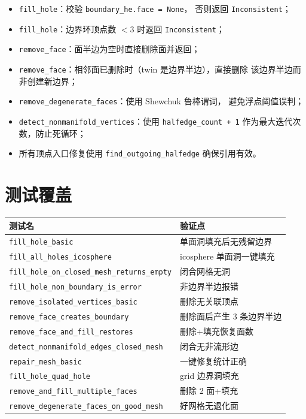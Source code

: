 \documentclass[11pt,a4paper]{article}
\begin{document}
\begin{itemize}
  \item \texttt{fill\_hole}：校验 \texttt{boundary\_he.face = None}，
        否则返回 \texttt{Inconsistent}；
  \item \texttt{fill\_hole}：边界环顶点数 $< 3$ 时返回 \texttt{Inconsistent}；
  \item \texttt{remove\_face}：面半边为空时直接删除面并返回；
  \item \texttt{remove\_face}：相邻面已删除时（twin 是边界半边），直接删除
        该边界半边而非创建新边界；
  \item \texttt{remove\_degenerate\_faces}：使用 Shewchuk 鲁棒谓词，
        避免浮点阈值误判；
  \item \texttt{detect\_nonmanifold\_vertices}：使用 \texttt{halfedge\_count + 1}
        作为最大迭代次数，防止死循环；
  \item 所有顶点入口修复使用 \texttt{find\_outgoing\_halfedge} 确保引用有效。
\end{itemize}

\section{测试覆盖}

\begin{center}
\renewcommand{\arraystretch}{1.18}
\begin{tabular}{@{}ll@{}}
  \toprule
  \textbf{测试名} & \textbf{验证点} \\
  \midrule
  \texttt{fill\_hole\_basic} & 单面洞填充后无残留边界 \\
  \texttt{fill\_all\_holes\_icosphere} & icosphere 单面洞一键填充 \\
  \texttt{fill\_hole\_on\_closed\_mesh\_returns\_empty} & 闭合网格无洞 \\
  \texttt{fill\_hole\_non\_boundary\_is\_error} & 非边界半边报错 \\
  \texttt{remove\_isolated\_vertices\_basic} & 删除无关联顶点 \\
  \texttt{remove\_face\_creates\_boundary} & 删除面后产生 3 条边界半边 \\
  \texttt{remove\_face\_and\_fill\_restores} & 删除+填充恢复面数 \\
  \texttt{detect\_nonmanifold\_edges\_closed\_mesh} & 闭合无非流形边 \\
  \texttt{repair\_mesh\_basic} & 一键修复统计正确 \\
  \texttt{fill\_hole\_quad\_hole} & grid 边界洞填充 \\
  \texttt{remove\_and\_fill\_multiple\_faces} & 删除 2 面+填充 \\
  \texttt{remove\_degenerate\_faces\_on\_good\_mesh} & 好网格无退化面 \\
  \bottomrule
\end{tabular}
\end{center}
\end{document}
